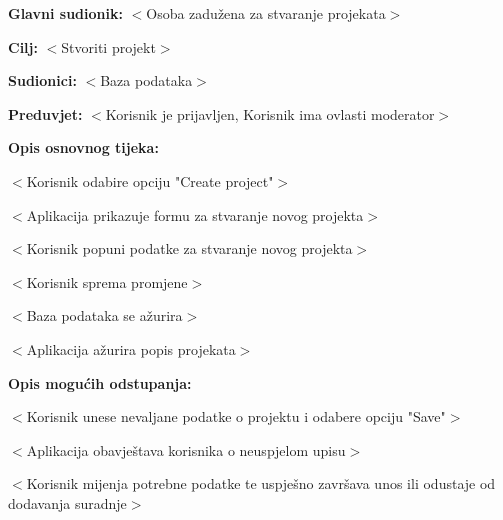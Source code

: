 					\noindent {}
					\begin{packed_item}

						\item \textbf{Glavni sudionik:} $<$Osoba zadužena za stvaranje projekata$>$
						\item \textbf{Cilj:} $<$Stvoriti projekt$>$
						\item \textbf{Sudionici:} $<$Baza podataka$>$
						\item \textbf{Preduvjet:} $<$Korisnik je prijavljen, Korisnik ima ovlasti moderator$>$
						\item \textbf{Opis osnovnog tijeka:}

						\item[] \begin{packed_enum}

							\item $<$Korisnik odabire opciju "Create project"$>$
							\item $<$Aplikacija prikazuje formu za stvaranje novog projekta$>$
							\item $<$Korisnik popuni podatke za stvaranje novog projekta$>$
							\item $<$Korisnik sprema promjene$>$
							\item $<$Baza podataka se ažurira$>$
							\item $<$Aplikacija ažurira popis projekata$>$
						\end{packed_enum}

						\item \textbf{Opis mogućih odstupanja:}

						\item[] \begin{packed_item}

							\item[7.b] $<$Korisnik unese nevaljane podatke o projektu i odabere opciju "Save"$>$
							\item[] \begin{packed_enum}

								\item $<$Aplikacija obavještava korisnika o neuspjelom upisu$>$
								\item $<$Korisnik mijenja potrebne podatke te uspješno završava unos ili
								odustaje od dodavanja suradnje$>$

							\end{packed_enum}

						\end{packed_item}
					\end{packed_item}

